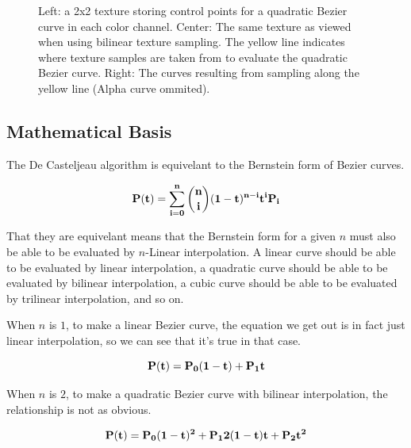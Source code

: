 \documentclass{jcgt}
\begin{document}
\begin{figure}
    \caption{Left: a 2x2 texture storing control points for a quadratic Bezier curve in each color channel.  Center: The same texture as viewed when using bilinear texture sampling.  The yellow line indicates where texture samples are taken from to evaluate the quadratic Bezier curve. Right: The curves resulting from sampling along the yellow line (Alpha curve ommited).}   
    \label{fig:texbilcurve}
  \end{figure}  

\subsection{Mathematical Basis}

The De Casteljeau algorithm is equivelant to the Bernstein form of Bezier curves.

\begin{equation}
\bf{P(t)} = \sum\limits_{i=0}^n\binom {n} {i}(1-t)^{n-i}t^i\text{\bf{P}}_i
\label{eqn:bernsteinform}
\end{equation}

That they are equivelant means that the Bernstein form for a given $n$ must also be able to be evaluated by $n$-Linear interpolation.  A linear curve should be able to be evaluated by linear interpolation, a quadratic curve should be able to be evaluated by bilinear interpolation, a cubic curve should be able to be evaluated by trilinear interpolation, and so on.

When $n$ is $1$, to make a linear Bezier curve, the equation we get out is in fact just linear interpolation, so we can see that it's true in that case.

\begin{equation}
\bf{P(t)} = P_0(1-t) + P_1t
\label{eqn:bernsteinformn1}
\end{equation}

When $n$ is $2$, to make a quadratic Bezier curve with bilinear interpolation, the relationship is not as obvious.

\begin{equation}
\bf{P(t)} = P_0(1-t)^2 + P_12(1-t)t + P_2t^2
\label{eqn:bernsteinformn2}
\end{equation}
\end{document}

